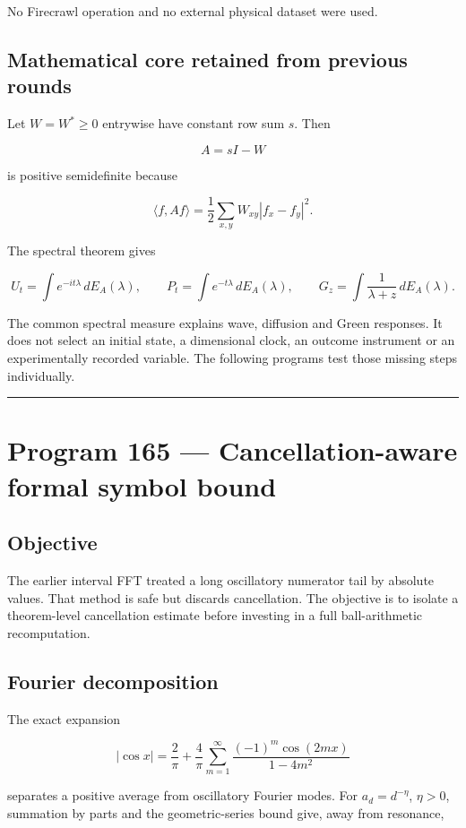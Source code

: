 \documentclass[11pt,a4paper,openany]{report}
\begin{document}
No Firecrawl operation and no external physical dataset were used.

\section{Mathematical core retained from previous rounds}

Let \(W=W^\ast\ge0\) entrywise have constant row sum \(s\). Then

\[
A=sI-W
\]

is positive semidefinite because

\[
\langle f,Af\rangle
=\frac12\sum_{x,y}W_{xy}|f_x-f_y|^2.
\]

The spectral theorem gives

\[
U_t=\int e^{-it\lambda}\,dE_A(\lambda),\qquad
P_t=\int e^{-t\lambda}\,dE_A(\lambda),\qquad
G_z=\int\frac{1}{\lambda+z}\,dE_A(\lambda).
\]

The common spectral measure explains wave, diffusion and Green responses. It does not select an initial state, a dimensional clock, an outcome instrument or an experimentally recorded variable. The following programs test those missing steps individually.

\par\medskip\hrule\medskip

\chapter{Program 165 --- Cancellation-aware formal symbol bound}

\section{Objective}

The earlier interval FFT treated a long oscillatory numerator tail by absolute values. That method is safe but discards cancellation. The objective is to isolate a theorem-level cancellation estimate before investing in a full ball-arithmetic recomputation.

\section{Fourier decomposition}

The exact expansion

\[
|\cos x|
=\frac2\pi+
\frac4\pi\sum_{m=1}^{\infty}
\frac{(-1)^m\cos(2mx)}{1-4m^2}
\]

separates a positive average from oscillatory Fourier modes. For \(a_d=d^{-\eta}\), \(\eta>0\), summation by parts and the geometric-series bound give, away from resonance,
\end{document}
